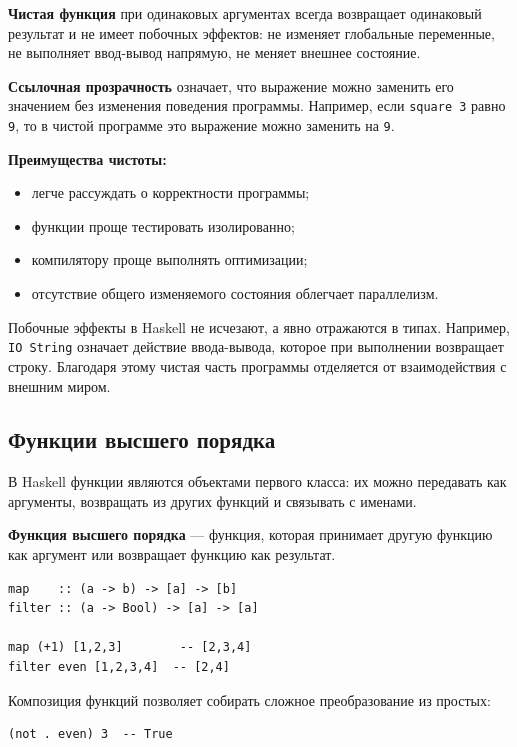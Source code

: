 \textbf{Чистая функция} при одинаковых аргументах всегда возвращает одинаковый результат и не имеет побочных эффектов: не изменяет глобальные переменные, не выполняет ввод-вывод напрямую, не меняет внешнее состояние.

\textbf{Ссылочная прозрачность} означает, что выражение можно заменить его значением без изменения поведения программы. Например, если \texttt{square 3} равно \texttt{9}, то в чистой программе это выражение можно заменить на \texttt{9}.

\textbf{Преимущества чистоты:}
\begin{itemize}
    \item легче рассуждать о корректности программы;
    \item функции проще тестировать изолированно;
    \item компилятору проще выполнять оптимизации;
    \item отсутствие общего изменяемого состояния облегчает параллелизм.
\end{itemize}

Побочные эффекты в Haskell не исчезают, а явно отражаются в типах. Например, \texttt{IO String} означает действие ввода-вывода, которое при выполнении возвращает строку. Благодаря этому чистая часть программы отделяется от взаимодействия с внешним миром.

\subsection*{Функции высшего порядка}

В Haskell функции являются объектами первого класса: их можно передавать как аргументы, возвращать из других функций и связывать с именами.

\textbf{Функция высшего порядка} --- функция, которая принимает другую функцию как аргумент или возвращает функцию как результат.

\begin{verbatim}
map    :: (a -> b) -> [a] -> [b]
filter :: (a -> Bool) -> [a] -> [a]

map (+1) [1,2,3]        -- [2,3,4]
filter even [1,2,3,4]  -- [2,4]
\end{verbatim}

Композиция функций позволяет собирать сложное преобразование из простых:

\begin{verbatim}
(not . even) 3  -- True
\end{verbatim}

